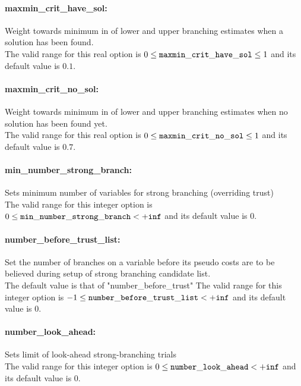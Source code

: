\paragraph{maxmin\_crit\_have\_sol:}\label{sec:maxmin_crit_have_sol} Weight towards minimum in of lower and upper branching estimates when a solution has been found. $\;$ \\
 The valid range for this real option is 
$0 \le {\tt maxmin\_crit\_have\_sol } \le 1$
and its default value is $0.1$.


\paragraph{maxmin\_crit\_no\_sol:}\label{sec:maxmin_crit_no_sol} Weight towards minimum in of lower and upper branching estimates when no solution has been found yet. $\;$ \\
 The valid range for this real option is 
$0 \le {\tt maxmin\_crit\_no\_sol } \le 1$
and its default value is $0.7$.


\paragraph{min\_number\_strong\_branch:}\label{sec:min_number_strong_branch} Sets minimum number of variables for strong branching (overriding trust) $\;$ \\
 The valid range for this integer option is
$0 \le {\tt min\_number\_strong\_branch } <  {\tt +inf}$
and its default value is $0$.


\paragraph{number\_before\_trust\_list:}\label{sec:number_before_trust_list} Set the number of branches on a variable before its pseudo costs are to be believed during setup of strong branching candidate list. $\;$ \\
 The default value is that of
"number\_before\_trust" The valid range for this integer option is
$-1 \le {\tt number\_before\_trust\_list } <  {\tt +inf}$
and its default value is $0$.


\paragraph{number\_look\_ahead:}\label{sec:number_look_ahead} Sets limit of look-ahead strong-branching trials $\;$ \\
 The valid range for this integer option is
$0 \le {\tt number\_look\_ahead } <  {\tt +inf}$
and its default value is $0$.


